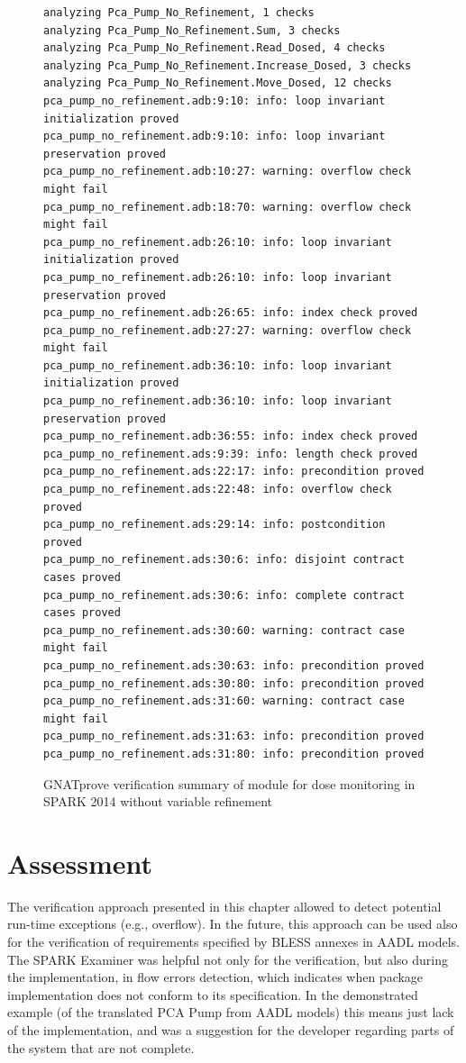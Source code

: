 \begin{figure}
\singlespacing
\begin{lstlisting}[frame=single, gobble=0]
analyzing Pca_Pump_No_Refinement, 1 checks
analyzing Pca_Pump_No_Refinement.Sum, 3 checks
analyzing Pca_Pump_No_Refinement.Read_Dosed, 4 checks
analyzing Pca_Pump_No_Refinement.Increase_Dosed, 3 checks
analyzing Pca_Pump_No_Refinement.Move_Dosed, 12 checks
pca_pump_no_refinement.adb:9:10: info: loop invariant initialization proved
pca_pump_no_refinement.adb:9:10: info: loop invariant preservation proved
pca_pump_no_refinement.adb:10:27: warning: overflow check might fail
pca_pump_no_refinement.adb:18:70: warning: overflow check might fail
pca_pump_no_refinement.adb:26:10: info: loop invariant initialization proved
pca_pump_no_refinement.adb:26:10: info: loop invariant preservation proved
pca_pump_no_refinement.adb:26:65: info: index check proved
pca_pump_no_refinement.adb:27:27: warning: overflow check might fail
pca_pump_no_refinement.adb:36:10: info: loop invariant initialization proved
pca_pump_no_refinement.adb:36:10: info: loop invariant preservation proved
pca_pump_no_refinement.adb:36:55: info: index check proved
pca_pump_no_refinement.ads:9:39: info: length check proved
pca_pump_no_refinement.ads:22:17: info: precondition proved
pca_pump_no_refinement.ads:22:48: info: overflow check proved
pca_pump_no_refinement.ads:29:14: info: postcondition proved
pca_pump_no_refinement.ads:30:6: info: disjoint contract cases proved
pca_pump_no_refinement.ads:30:6: info: complete contract cases proved
pca_pump_no_refinement.ads:30:60: warning: contract case might fail
pca_pump_no_refinement.ads:30:63: info: precondition proved
pca_pump_no_refinement.ads:30:80: info: precondition proved
pca_pump_no_refinement.ads:31:60: warning: contract case might fail
pca_pump_no_refinement.ads:31:63: info: precondition proved
pca_pump_no_refinement.ads:31:80: info: precondition proved
\end{lstlisting}
\doublespacing
\caption{GNATprove verification summary of module for dose monitoring in SPARK 2014 without variable refinement}
\label{listing:pca_pump_move_dosed_unit_spark2014_gnatprove_no_refinement}
\end{figure}


\section{Assessment}
\label{verification:assessment}

The verification approach presented in this chapter allowed to detect potential run-time exceptions (e.g., overflow). In the future, this approach can be used also for the verification of requirements specified by BLESS annexes in AADL models. The SPARK Examiner was helpful not only for the verification, but also during the implementation, in flow errors detection, which indicates when package implementation does not conform to its specification. In the demonstrated example (of the translated PCA Pump from AADL models) this means just lack of the implementation, and was a suggestion for the developer regarding parts of the system that are not complete.

